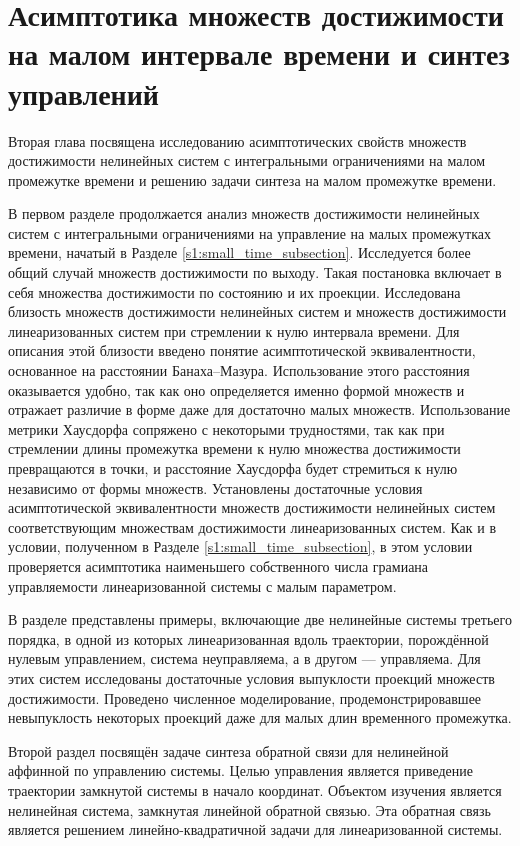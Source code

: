 \documentclass[../main.tex]{subfiles}
\begin{document}
\clearpage
\section{Асимптотика множеств достижимости на малом интервале времени и синтез управлений}

Вторая глава посвящена исследованию асимптотических свойств множеств достижимости нелинейных систем с интегральными ограничениями на малом промежутке времени и решению задачи синтеза на малом промежутке времени. 

В первом разделе продолжается анализ множеств достижимости нелинейных систем с интегральными ограничениями на управление на малых промежутках времени, начатый в Разделе \ref{s1:small_time_subsection}. 
Исследуется более общий случай множеств достижимости по выходу.
Такая постановка включает в себя множества достижимости по состоянию и их проекции.
Исследована близость множеств достижимости нелинейных систем и множеств достижимости линеаризованных систем при стремлении к нулю интервала времени. 
Для описания этой близости введено понятие асимптотической эквивалентности, основанное на расстоянии Банаха--Мазура. 
Использование этого расстояния оказывается удобно, так как оно определяется именно формой множеств и отражает различие в форме даже для достаточно малых множеств. 
Использование метрики Хаусдорфа сопряжено с некоторыми трудностями, так как при стремлении длины промежутка времени к нулю множества достижимости превращаются в точки, и расстояние Хаусдорфа будет стремиться к нулю независимо от формы множеств.
Установлены достаточные условия асимптотической эквивалентности множеств достижимости нелинейных систем соответствующим множествам достижимости линеаризованных систем.
Как и в условии, полученном в Разделе \ref{s1:small_time_subsection}, в этом условии проверяется асимптотика наименьшего собственного числа грамиана управляемости линеаризованной системы с малым параметром.

В разделе представлены примеры, включающие две нелинейные системы третьего порядка, в одной из которых линеаризованная вдоль траектории, порождённой нулевым управлением, система неуправляема, а в другом --- управляема.
Для этих систем исследованы достаточные условия выпуклости проекций множеств достижимости. 
Проведено численное моделирование, продемонстрировавшее невыпуклость некоторых проекций даже для малых длин временного промежутка.

Второй раздел посвящён задаче синтеза обратной связи для нелинейной аффинной по управлению системы. 
Целью управления является приведение траектории замкнутой системы в начало координат. 
Объектом изучения является нелинейная система, замкнутая линейной обратной связью. 
Эта обратная связь является решением линейно-квадратичной задачи для линеаризованной системы. 
\end{document}
